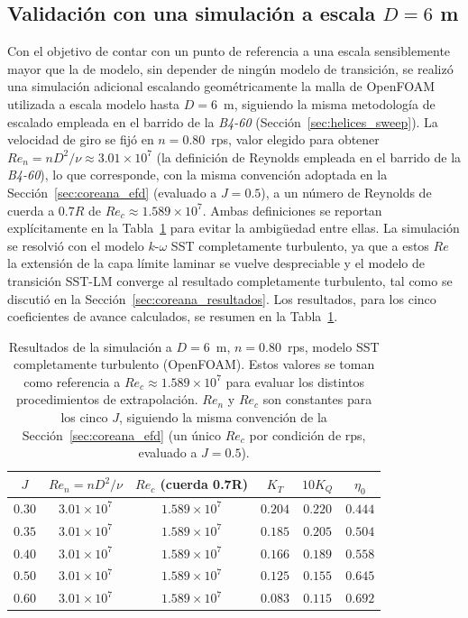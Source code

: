 \subsection{Validación con una simulación a escala $D=6$ m}
\label{sec:coreana_d6m}

Con el objetivo de contar con un punto de referencia a una escala sensiblemente mayor
que la de modelo, sin depender de ningún modelo de transición, se realizó una
simulación adicional escalando geométricamente la malla de OpenFOAM utilizada a
escala modelo hasta $D=6$~m, siguiendo la misma metodología de escalado empleada en
el barrido de la \textit{B4-60} (Sección~\ref{sec:helices_sweep}). La velocidad de giro se fijó
en $n=0.80$~rps, valor elegido para obtener $Re_n = nD^2/\nu \approx 3.01\times10^7$ (la definición de Reynolds empleada en el barrido de la \textit{B4-60}), lo que corresponde,
con la misma convención adoptada en la Sección~\ref{sec:coreana_efd} (evaluado a
$J=0.5$), a un número de Reynolds de cuerda a $0.7R$ de
$Re_c \approx 1.589\times10^7$. Ambas definiciones se reportan explícitamente en la
Tabla~\ref{tab:d6m_resultados} para evitar la ambigüedad entre ellas. La simulación se
resolvió con el modelo $k$-$\omega$ SST completamente turbulento, ya que a estos $Re$
la extensión de la capa límite laminar se vuelve despreciable y el modelo de
transición SST-LM converge al resultado completamente turbulento, tal como se discutió
en la Sección~\ref{sec:coreana_resultados}. Los resultados, para los cinco coeficientes
de avance calculados, se resumen en la Tabla~\ref{tab:d6m_resultados}.

\begin{table}[htpb]
\centering
\caption{Resultados de la simulación a $D=6$~m, $n=0.80$~rps, modelo SST
completamente turbulento (OpenFOAM). Estos valores se toman como referencia a $Re_c \approx 1.589\times10^7$ para evaluar los distintos procedimientos de extrapolación. $Re_n$ y $Re_c$ son constantes para los cinco $J$, siguiendo la misma convención de
la Sección~\ref{sec:coreana_efd} (un único $Re_c$ por condición de rps, evaluado a
$J=0.5$).}
\label{tab:d6m_resultados}
\begin{tabular}{cccccc}
\hline
$J$ & $Re_n=nD^2/\nu$ & $Re_c$ (cuerda 0.7R) & $K_T$ & $10K_Q$ & $\eta_0$ \\
\hline
$0.30$ & $3.01\times10^7$ & $1.589\times10^7$ & $0.204$ & $0.220$ & $0.444$ \\
$0.35$ & $3.01\times10^7$ & $1.589\times10^7$ & $0.185$ & $0.205$ & $0.504$ \\
$0.40$ & $3.01\times10^7$ & $1.589\times10^7$ & $0.166$ & $0.189$ & $0.558$ \\
$0.50$ & $3.01\times10^7$ & $1.589\times10^7$ & $0.125$ & $0.155$ & $0.645$ \\
$0.60$ & $3.01\times10^7$ & $1.589\times10^7$ & $0.083$ & $0.115$ & $0.692$ \\
\hline
\end{tabular}
\end{table}

